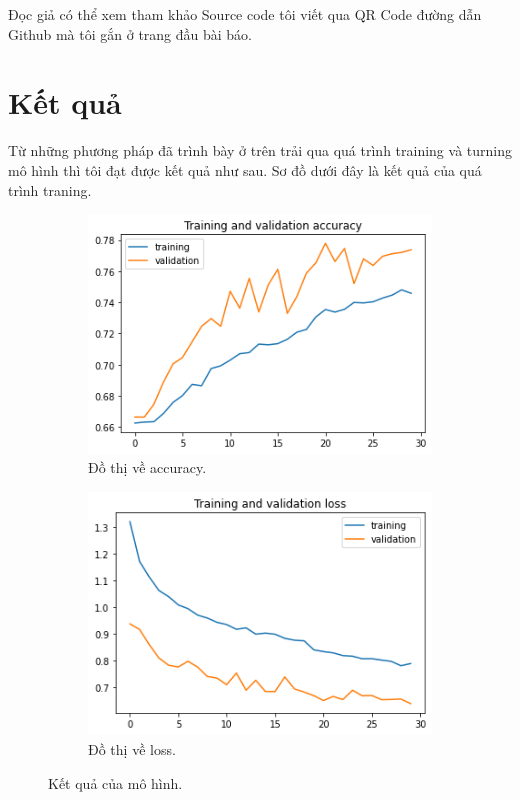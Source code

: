 \documentclass[12pt,a4paper]{article}
\begin{document}
	\noindent
	Đọc giả có thể xem tham khảo Source code tôi viết qua QR Code đường dẫn Github mà tôi gắn ở trang đầu bài báo.
	
	\section{Kết quả}
	Từ những phương pháp đã trình bày ở trên trải qua quá trình training và turning mô hình thì tôi đạt được kết quả như sau. Sơ đồ dưới đây là kết quả của quá trình traning.
	
	\begin{figure}[h!]
		\centering
		\begin{subfigure}[b]{0.4\linewidth}
			\includegraphics[width=\linewidth]{./images/accuracy.png}
			\caption{Đồ thị về accuracy.}
		\end{subfigure}
		\begin{subfigure}[b]{0.4\linewidth}
			\includegraphics[width=\linewidth]{./images/loss.png}
			\caption{Đồ thị về loss.}
		\end{subfigure}
		\caption{Kết quả của mô hình.}
		\label{fig:ketQua}
	\end{figure}
	
\end{document}
